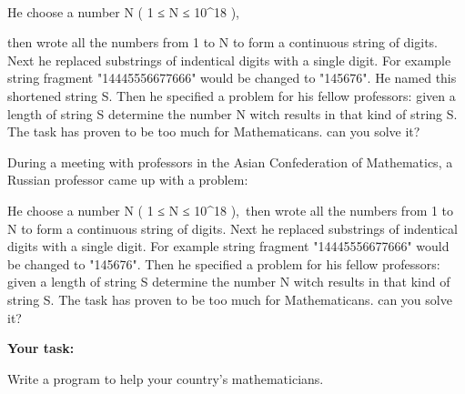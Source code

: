 \\





    He choose a number N ( 1 ≤ N ≤ 10^18 ),   

    then wrote all the numbers from 1 to N to form a continuous string of digits. Next he replaced substrings of indentical digits with a single digit. For example string fragment "14445556677666" would be changed to "145676". He named this shortened string S. Then he specified a problem for his fellow professors: given a length of string S determine the number N witch results in that kind of string S. The task has proven to be too much for Mathematicans. can you solve it?   



    During a meeting with professors in the Asian Confederation of Mathematics, a Russian professor came up with a problem:   



    He choose a number N ( 1 ≤ N ≤ 10^18 ), then wrote all the numbers from 1 to N to form a continuous string of digits. Next he replaced substrings of indentical digits with a single digit. For example string fragment "14445556677666" would be changed to "145676". Then he specified a problem for his fellow professors: given a length of string S determine the number N witch results in that kind of string S. The task has proven to be too much for Mathematicans. can you solve it?   



\textbf{     Your task:    }



    Write a program to help your country's mathematicians.